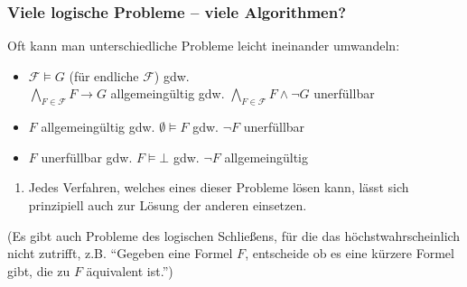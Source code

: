 \documentclass[onlymath]{beamer}
\begin{document}
\begin{frame}\frametitle{Viele logische Probleme -- viele Algorithmen?}

Oft kann man unterschiedliche Probleme leicht ineinander umwandeln:
\medskip

\begin{itemize}
\item $\mathcal{F}\models G$ (für endliche $\mathcal{F}$) \alert{gdw.}\\ $\bigwedge_{F\in\mathcal{F}}F\to G$ allgemeingültig \alert{gdw.} $\bigwedge_{F\in\mathcal{F}}F\wedge\neg G$ unerfüllbar
\item $F$ allgemeingültig \alert{gdw.} $\emptyset\models F$ \alert{gdw.} $\neg F$ unerfüllbar
\item $F$ unerfüllbar \alert{gdw.} $F\models \bot$ \alert{gdw.} $\neg F$ allgemeingültig
\end{itemize}
\begin{enumerate}[$\leadsto$]
\item Jedes Verfahren, welches eines dieser Probleme lösen kann, lässt sich prinzipiell auch zur Lösung der anderen einsetzen.
\end{enumerate}

{\footnotesize\textcolor{devilscss}{%
(Es gibt auch Probleme des logischen Schließens, für die das höchstwahrscheinlich nicht zutrifft, z.B. "`Gegeben eine Formel $F$, entscheide ob es eine kürzere Formel gibt, die zu $F$ äquivalent ist."')}
}

\end{frame}
\end{document}
